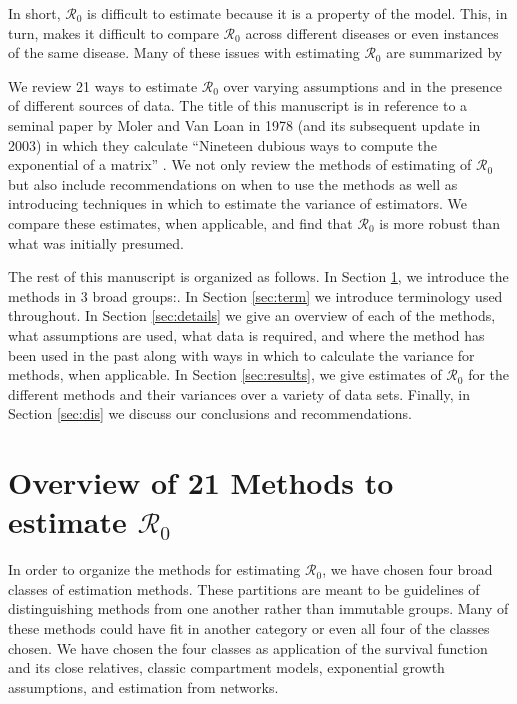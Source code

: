 \documentclass[12pt]{article}
\newcommand{\XX}{21 } %
\newcommand{\rr}{\ensuremath{\mathcal{R}_0}}
\begin{document}
In short, $\rr$ is difficult to estimate because it is a property of the model.  This, in turn, makes it difficult to compare $\rr$ across different diseases or even instances of the same disease.  Many of these issues with estimating $\rr$ are summarized by \cite{li2011}

We review \XX ways to estimate $\rr$ over varying assumptions and in the presence of different sources of data.  The title of this manuscript is in reference to a seminal paper by Moler and Van Loan in 1978 (and its subsequent update in 2003) in which they calculate ``Nineteen dubious ways to compute the exponential of a matrix'' \citep{moler2003}.  We not only review the methods of estimating of $\rr$ but also include recommendations on when to use the methods as well as introducing techniques in which to estimate the variance of estimators.  We compare these estimates, when applicable, and find that $\rr$ is more robust than what was initially presumed.

The rest of this manuscript is organized as follows.  In Section \ref{sec:overview}, we introduce the methods in 3 broad groups:.  In Section \ref{sec:term} we introduce terminology used throughout.  In Section \ref{sec:details} we give an overview of each of the methods, what assumptions are used, what data is required, and where the method has been used in the past along with ways in which to calculate the variance for methods, when applicable.  In Section \ref{sec:results}, we give estimates of $\rr$ for the different methods and their variances over a variety of data sets.  Finally, in Section \ref{sec:dis} we discuss our conclusions and recommendations.


\section{Overview of \XX Methods to estimate $\rr$}
\label{sec:overview}

In order to organize the methods for estimating \rr, we have chosen four broad classes of estimation methods.  These partitions are meant to be guidelines of distinguishing methods from one another rather than immutable groups.  Many of these methods could have fit in another category or even all four of the classes chosen.  We have chosen the four classes as application of the survival function and its close relatives, classic compartment models, exponential growth assumptions, and estimation from networks.
\end{document}
